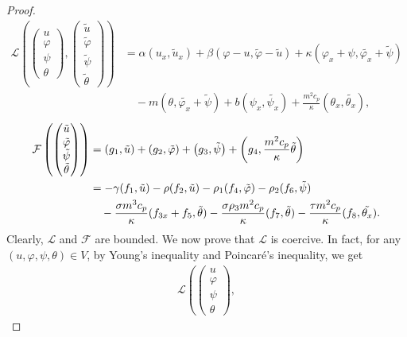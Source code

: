 \documentclass[11pt,reqno]{article}
\begin{document}
\begin{proof}
\begin{equation}
		\begin{split}
			\mathcal{L}\left(
			\begin{pmatrix}u\\ \varphi \\ \psi \\ \theta\end{pmatrix},
			\begin{pmatrix}\tilde{u}\\ \tilde{\varphi} \\ \tilde{\psi} \\ \tilde{\theta}\end{pmatrix}
			\right) &= \alpha (u_x, \tilde{u}_x) + \beta (\varphi - u, \tilde{\varphi} - \tilde{u}) + \kappa (\varphi_x + \psi, \tilde{\varphi_x} + \tilde{\psi}) \\
			&\quad - m(\theta, \tilde{\varphi_x}+ \tilde{\psi}) + b (\psi_x, \tilde{\psi_x})   + \frac{m^2 c_p}{\kappa} (\theta_x, \tilde{\theta_x}),
		\end{split}
	\end{equation}
	\begin{align}\label{F}
		\mathcal{F}\left(
		\begin{pmatrix}\tilde{u}\\ \tilde{\varphi} \\ \tilde{\psi} \\ \tilde{\theta}\end{pmatrix}
		\right) &= \left(g_1, \tilde{u}\right) + \left(g_2, \tilde{\varphi}\right) + \left(g_3, \tilde{\psi}\right) + \left(g_4, \frac{m^2 c_p}{\kappa }\tilde{\theta}\right) \notag \\
		&=  - \gamma (f_1, \tilde{u}) - \rho (f_2, \tilde{u}) - \rho_1 (f_4, \tilde{\varphi}) - \rho_2 (f_6, \tilde{\psi})  \notag \\
		&\quad  - \frac{\sigma m^3 c_p }{\kappa } (f_{3x} + f_5, \tilde{\theta}) - \frac{\sigma \rho_3 m^2 c_p }{\kappa } (f_7, \tilde{\theta}) - \frac{\tau m^2 c_p}{\kappa}(f_8, \tilde{\theta_x}).
	\end{align}
	Clearly, $\mathcal{L}$ and $\mathcal{F}$ are bounded. We now prove that $\mathcal{L}$ is coercive. In fact, for any $(u, \varphi, \psi, \theta) \in V$, by Young's inequality and Poincar\'e's inequality, we get
	\begin{align*}\label{L-1}
		\mathcal{L}\left(
		\begin{pmatrix}u\\ \varphi \\ \psi \\ \theta\end{pmatrix},

\end{align*}
\end{proof}
\end{document}
